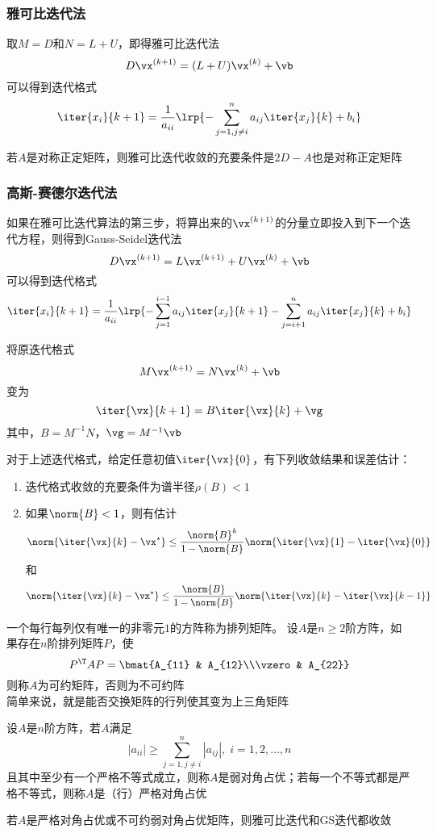 \subsubsection{雅可比迭代法}
取$M=D$和$N=L+U$，即得雅可比迭代法
\[D\vx^{(k+1)}=(L+U)\vx^{(k)}+\vb\]
可以得到迭代格式
\[\iter{x_i}{k+1}=\frac{1}{a_{ii}}\lrp{-\sum_{j=1,j\ne i}^n a_{ij}\iter{x_j}{k}+b_i}\]

\begin{theorem}
    若$A$是对称正定矩阵，则雅可比迭代收敛的充要条件是$2D-A$也是对称正定矩阵
\end{theorem}

\subsubsection{高斯-赛德尔迭代法}
如果在雅可比迭代算法的第三步，将算出来的$\vx^{(k+1)}$的分量立即投入到下一个迭代方程，则得到Gauss-Seidel迭代法
\[D\vx^{(k+1)}=L\vx^{(k+1)}+U\vx^{(k)}+\vb\]
可以得到迭代格式
\[\iter{x_i}{k+1}=\frac{1}{a_{ii}}\lrp{-\sum_{j=1}^{i-1}a_{ij}\iter{x_j}{k+1}-\sum_{j=i+1}^na_{ij}\iter{x_j}{k}+b_i}\]

将原迭代格式
\[M\vx^{(k+1)}=N\vx^{(k)}+\vb\]
变为
\[\iter{\vx}{k+1}=B\iter{\vx}{k}+\vg\]
其中，$B=M^{-1}N$，$\vg=M^{-1}\vb$
\begin{theorem}
    对于上述迭代格式，给定任意初值$\iter{\vx}{0}$，有下列收敛结果和误差估计：
    \begin{enumerate}
        \item 迭代格式收敛的充要条件为谱半径$\rho(B)<1$
        \item 如果$\norm{B}<1$，则有估计
        \[\norm{\iter{\vx}{k}-\vx^\star}\leq\frac{\norm{B}^{k}}{1-\norm{B}}\norm{\iter{\vx}{1}-\iter{\vx}{0}}\]
        和
        \[\norm{\iter{\vx}{k}-\vx^\star}\leq\frac{\norm{B}}{1-\norm{B}}\norm{\iter{\vx}{k}-\iter{\vx}{k-1}}\]
    \end{enumerate}
\end{theorem}

\begin{definition}[不可约]
    一个每行每列仅有唯一的非零元$1$的方阵称为排列矩阵。
    设$A$是$n\geq 2$阶方阵，如果存在$n$阶排列矩阵$P$，使
    \[P^\T AP=\bmat{A_{11} & A_{12}\\\vzero & A_{22}}\]
    则称$A$为可约矩阵，否则为不可约阵\\
    简单来说，就是能否交换矩阵的行列使其变为上三角矩阵
\end{definition}
\begin{definition}[对角占优]
    设$A$是$n$阶方阵，若$A$满足
    \[|a_{ii}|\geq \sum_{j=1,j\ne i}^n|a_{ij}|,\;i=1,2,\ldots,n\]
    且其中至少有一个严格不等式成立，则称$A$是弱对角占优；若每一个不等式都是严格不等式，则称$A$是（行）严格对角占优
\end{definition}
\begin{theorem}
    若$A$是严格对角占优或不可约弱对角占优矩阵，则雅可比迭代和GS迭代都收敛
\end{theorem}

